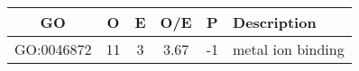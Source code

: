 \begin{tabular}{cccccl}
  \hline
  GO & O & E & O/E & P & Description\\\hline
  GO:0046872 & 11 & 3 & 3.67 & -1 & metal ion binding\\
  \hline
\end{tabular}
